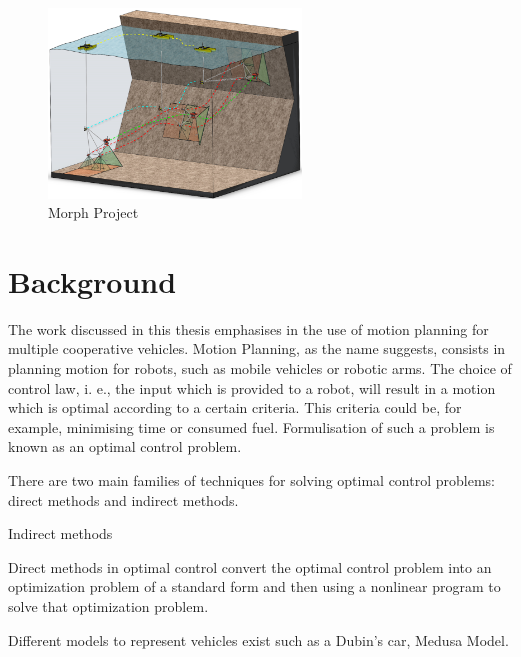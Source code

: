\begin{figure}[h!]
    \centering
    \includegraphics[width=0.6\textwidth]{Images/projects/Picture1.png}
    \caption{Morph Project}
    \label{fig:morph}
\end{figure}


\section{Background}

\par The work discussed in this thesis emphasises in the use of motion planning for multiple cooperative vehicles. Motion Planning, as the name suggests, consists in planning motion for robots, such as mobile vehicles or robotic arms. The choice of control law, i. e., the input which is provided to a robot, will result in a motion which is optimal according to a certain criteria. This criteria could be, for example, minimising time or consumed fuel. Formulisation of such a problem is known as an optimal control problem.
\par There are two main families of techniques for solving optimal control problems: direct methods and indirect methods.
\par Indirect methods 
\par Direct methods in optimal control convert the optimal control problem into an optimization problem of a standard form and then using a nonlinear program to solve that optimization problem. 

\par Different models to represent vehicles exist such as a Dubin's car, Medusa Model.



